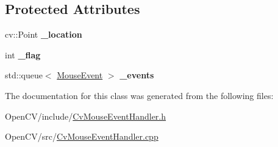 \subsection*{Protected Attributes}
\begin{DoxyCompactItemize}
\item 
\hypertarget{classskl_1_1_cv_mouse_event_handler_a1362364b6f62514a5517bab7dafd5d40}{}\label{classskl_1_1_cv_mouse_event_handler_a1362364b6f62514a5517bab7dafd5d40} 
cv\+::\+Point {\bfseries \+\_\+location}
\item 
\hypertarget{classskl_1_1_cv_mouse_event_handler_aaa1f14b43bfaf39760edd7ad6a73f46f}{}\label{classskl_1_1_cv_mouse_event_handler_aaa1f14b43bfaf39760edd7ad6a73f46f} 
int {\bfseries \+\_\+flag}
\item 
\hypertarget{classskl_1_1_cv_mouse_event_handler_aedbff79ce36f31e7f4d74ea600df9864}{}\label{classskl_1_1_cv_mouse_event_handler_aedbff79ce36f31e7f4d74ea600df9864} 
std\+::queue$<$ \hyperlink{structskl_1_1_mouse_event}{Mouse\+Event} $>$ {\bfseries \+\_\+events}
\end{DoxyCompactItemize}


The documentation for this class was generated from the following files\+:\begin{DoxyCompactItemize}
\item 
Open\+C\+V/include/\hyperlink{_cv_mouse_event_handler_8h}{Cv\+Mouse\+Event\+Handler.\+h}\item 
Open\+C\+V/src/\hyperlink{_cv_mouse_event_handler_8cpp}{Cv\+Mouse\+Event\+Handler.\+cpp}\end{DoxyCompactItemize}
